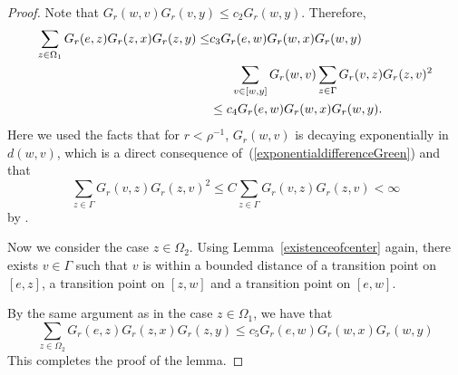 \documentclass{amsart}
\theoremstyle{definition}
\theoremstyle{remark}
\begin{document}
\begin{proof}
Note that $G_r(w, v) G_r(v, y) \leq c_2 G_r(w, y)$.  Therefore,
  \begin{align*}
    \sum_{z \in \Omega_1} G_r(e, z) G_r(z, x) G_r(z, y)
    \leq&
    c_3 G_r(e, w) G_r(w, x) G_r(w, y) \\
    &\hspace{.6cm}\sum_{v \in [w, y]} G_r(w, v) \sum_{z \in \Gamma} G_r(v,z)G_r(z, v)^2\\
    &
    \leq c_4 G_r(e, w) G_r(w, x) G_r(w, y). 
  \end{align*}
Here we used the facts that for $r < \rho^{-1}$, $G_r(w, v)$ is decaying exponentially in $d(w, v)$, which is a direct consequence of~(\ref{exponentialdifferenceGreen}) and that
$$\sum_{z \in \Gamma} G_r(v, z)G_r(z,v)^2\leq C\sum_{z\in \Gamma}G_r(v,z)G_r(z,v) < \infty$$
by \cite[Proposition~1.9]{GouezelLalley}.

\medskip
Now we consider the case $z \in \Omega_2$.  Using Lemma~\ref{existenceofcenter} again, there exists $v \in \Gamma$ such that
$v$ is within a bounded distance of a transition point on $[e,z]$, a transition point on $[z,w]$ and a transition point on $[e,w]$. 

  \begin{center}
\end{center}
  
By the same argument as in the case $z \in \Omega_1$, we have that
  \[
    \sum_{z \in \Omega_2} G_r(e, z) G_r(z, x) G_r(z, y)
    \leq
    c_5 G_r(e, w) G_r(w, x) G_r(w, y)
  \]
This completes the proof of the lemma.  
\end{proof}
\end{document}
